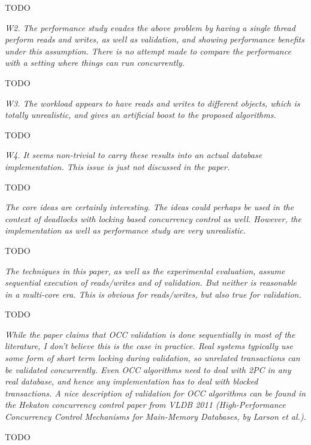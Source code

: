 \documentclass{article}
\begin{document}
\bigskip
TODO

\bigskip

\emph{W2. The performance study evades the above problem by having a single thread perform reads and writes, as well as validation, and showing performance benefits under this assumption. There is no attempt made to compare the performance with a setting where things can run concurrently. }

\bigskip
TODO

\bigskip

\emph{W3. The workload appears to have reads and writes to different objects, which is totally unrealistic, and gives an artificial boost to the proposed algorithms.}

\bigskip
TODO

\bigskip

\emph{W4. It seems non-trivial to carry these results into an actual database implementation. This issue is just not discussed in the paper.}

\bigskip
TODO

\bigskip

\emph{The core ideas are certainly interesting. The ideas could perhaps be used in the context of deadlocks with locking based concurrency control as well. However, the implementation as well as performance study are very unrealistic.}


\bigskip
TODO

\bigskip


\emph{The techniques in this paper, as well as the experimental evaluation, assume sequential execution of reads/writes and of validation. But neither is reasonable in a multi-core era. This is obvious for reads/writes, but also true for validation. 
}


\bigskip
TODO
\bigskip

\emph{While the paper claims that OCC validation is done sequentially in most of the literature, I don't believe this is the case in practice. Real systems typically use some form of short term locking during validation, so unrelated transactions can be validated concurrently. Even OCC algorithms need to deal with 2PC in any real database, and hence any implementation has to deal with blocked transactions. A nice description of validation for OCC algorithms can be found in the Hekaton concurrency control paper from VLDB 2011 (High-Performance Concurrency Control Mechanisms for Main-Memory Databases, by Larson et al.). }


\bigskip
TODO
\bigskip
\end{document}
